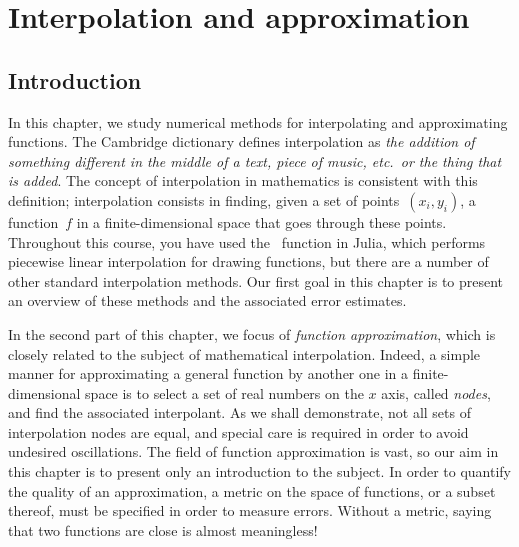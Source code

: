 \chapter{Interpolation and approximation}%
\label{cha:interpolation_and_approximation}

\minitoc

\section*{Introduction}
In this chapter,
we study numerical methods for interpolating and approximating functions.
The Cambridge dictionary defines interpolation as \emph{the addition of something different in the middle of a text, piece of music, etc.~or the thing that is added}.
The concept of interpolation in mathematics is consistent with this definition;
interpolation consists in finding, given a set of points~$(x_i, y_i)$,
a function~$f$ in a finite-dimensional space that goes through these points.
Throughout this course, you have used the~ function in Julia,
which performs piecewise linear interpolation for drawing functions,
but there are a number of other standard interpolation methods.
Our first goal in this chapter is to present an overview of these methods and the associated error estimates.

In the second part of this chapter,
we focus of \emph{function approximation},
which is closely related to the subject of mathematical interpolation.
Indeed, a simple manner for approximating a general function by another one in a finite-dimensional space is to select a set of real numbers on the $x$ axis,
called \emph{nodes}, and find the associated interpolant.
As we shall demonstrate, not all sets of interpolation nodes are equal,
and special care is required in order to avoid undesired oscillations.
The field of function approximation is vast,
so our aim in this chapter is to present only an introduction to the subject.
In order to quantify the quality of an approximation,
a metric on the space of functions,
or a subset thereof, must be specified in order to measure errors.
Without a metric, saying that two functions are close is almost meaningless!


